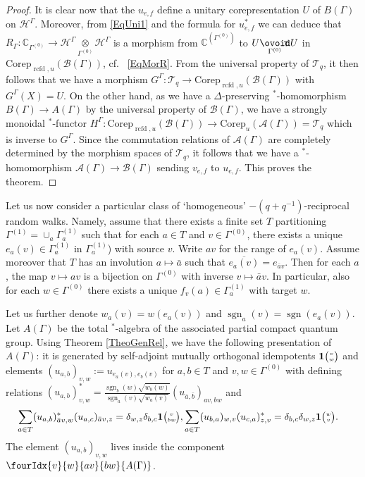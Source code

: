 \documentclass[10pt]{article}
\DeclareMathOperator{\rcf}{\mathrm{rcfd}}
\DeclareMathOperator{\sgn}{\mathrm{sgn}}
\newcommand{\Corep}{\mathrm{Corep}}
\newcommand{\Circtv}[1]{\underset{#1}{\mathop{\ooalign{$\ovoid$\cr\hidewidth\raise-.05ex\hbox{$\scriptstyle\mathsf T\mkern3.5mu$}\cr}}}} %
\newcommand{\C}{\mathbb{C}}
\newcommand{\Hsp}{\mathcal{H}}
\newcommand{\Grt}[3]{#1{\tiny {\begin{pmatrix} #2\\#3\end{pmatrix}}}}
\newcommand{\UnitC}[2]{\Grt{\mathbf{1}}{#1}{#2}}
\newcommand{\Gr}[5]{\fourIdx{#2}{#4}{#3}{#5}{#1}}%
\theoremstyle{definition}
\numberwithin{equation}{section}
\begin{document}
\begin{proof}
It is clear now that the $u_{e,f}$ define a unitary corepresentation $U$ of $B(\Gamma)$ on $\Hsp^{\Gamma}$. Moreover, from \eqref{EqUni1} and the formula for $u_{e,f}^*$ we can deduce that $R_{\Gamma}: \C_{\Gamma^{(0)}}\rightarrow \Hsp^{\Gamma}\underset{\Gamma^{(0)}}{\otimes}\Hsp^{\Gamma}$ is a morphism from $\C^{(\Gamma^{(0)})}$ to $U\Circtv{\Gamma^{(0)}} U$ in $\Corep_{\rcf,u}(\mathscr{B}(\Gamma))$, cf.~ \eqref{EqMorR}. From the universal property of $\mathcal{T}_q$, it then follows that we have a morphism $G^{\Gamma}: \mathcal{T}_q \rightarrow \Corep_{\rcf,u}(\mathscr{B}(\Gamma))$ with $G^{\Gamma}(X) = U$. On the other hand, as we have a $\Delta$-preserving $^*$-homomorphism $B(\Gamma)\rightarrow A(\Gamma)$ by the universal property of $\mathscr{B}(\Gamma)$, we have a strongly monoidal $^*$-functor $H^{\Gamma}:  \Corep_{\rcf,u}(\mathscr{B}(\Gamma))\rightarrow \Corep_u(\mathscr{A}(\Gamma)) = \mathcal{T}_q$ which is inverse to $G^{\Gamma}$. Since the commutation relations of $\mathscr{A}(\Gamma)$ are completely determined by the morphism spaces of $\mathcal{T}_q$, it follows that we have a $^*$-homomorphism $\mathscr{A}(\Gamma)\rightarrow \mathscr{B}(\Gamma)$ sending $v_{e,f}$ to $u_{e,f}$. This proves the theorem. 
\end{proof}


Let us now consider a particular class of `homogeneous' $-(q+q^{-1})$-reciprocal random walks. Namely, assume that there exists a finite set $T$ partitioning $\Gamma^{(1)} = \cup_a \Gamma^{(1)}_a$ such that for each $a\in T$ and $v\in \Gamma^{(0)}$, there exists a unique $e_a(v)\in \Gamma^{(1)}_a$ in $\Gamma^{(1)}_a$) with source $v$. Write $av$ for the range of $e_a(v)$. Assume moreover that $T$ has an involution $a\mapsto \bar{a}$ such that $\overline{e_a(v)} = e_{\bar{a}v}$. Then for each $a$, the map $v\mapsto av$ is a bijection on $\Gamma^{(0)}$ with inverse $v\mapsto \bar{a}v$. In particular, also for each $w\in \Gamma^{(0)}$ there exists a unique $f_v(a) \in \Gamma^{(1)}_a$ with target $w$.

Let us further denote $w_a(v) = w(e_a(v))$ and $\sgn_a(v) = \sgn(e_a(v))$. Let $A(\Gamma)$ be the total $^*$-algebra of the associated partial compact quantum group. Using Theorem \ref{TheoGenRel}, we have the following presentation of $A(\Gamma)$: it is generated by self-adjoint mutually orthogonal idempotents $\UnitC{v}{w}$ and elements $(u_{a,b})_{v,w} := u_{e_a(v),e_b(v)}$ for $a,b\in T$ and $v,w\in \Gamma^{(0)}$ with defining relations $(u_{a,b})_{v,w}^* = \frac{\sgn_b(w)\sqrt{w_b(w)}}{\sgn_a(v)\sqrt{w_a(v)}}(u_{\bar{a},\bar{b}})_{av,bw}$ and \begin{eqnarray*} \sum_{a\in T} (u_{a,b})_{\bar{a}v,w}^* (u_{a,c})_{\bar{a}v,z}= \delta_{w,z} \delta_{b,c} \UnitC{v}{bw},& \sum_{a\in T} (u_{b,a})_{w,v} (u_{c,a})_{z,v}^* = \delta_{b,c}\delta_{w,z} \UnitC{w}{v}.\end{eqnarray*} The element $(u_{a,b})_{v,w}$ lives inside the component $\Gr{A(\Gamma)}{v}{av}{w}{bw}$.
\end{document}
